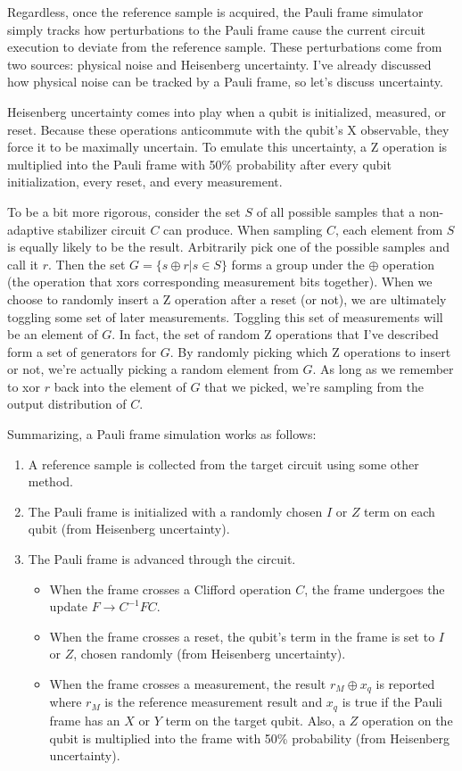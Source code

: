\documentclass[onecolumn,unpublished]{quantumarticle}
\theoremstyle{definition}
\theoremstyle{definition}
\theoremstyle{definition}
\begin{document}
Regardless, once the reference sample is acquired, the Pauli frame simulator simply tracks how perturbations to the Pauli frame cause the current circuit execution to deviate from the reference sample.
These perturbations come from two sources:
physical noise and Heisenberg uncertainty.
I've already discussed how physical noise can be tracked by a Pauli frame, so let's discuss uncertainty.

Heisenberg uncertainty comes into play when a qubit is initialized, measured, or reset.
Because these operations anticommute with the qubit's X observable, they force it to be maximally uncertain.
To emulate this uncertainty, a Z operation is multiplied into the Pauli frame with 50\% probability after every qubit initialization, every reset, and every measurement.

To be a bit more rigorous, consider the set $S$ of all possible samples that a non-adaptive stabilizer circuit $C$ can produce.
When sampling $C$, each element from $S$ is equally likely to be the result.
Arbitrarily pick one of the possible samples and call it $r$.
Then the set $G = \{s \oplus r | s \in S\}$ forms a group under the $\oplus$ operation (the operation that xors corresponding measurement bits together).
When we choose to randomly insert a Z operation after a reset (or not), we are ultimately toggling some set of later measurements.
Toggling this set of measurements will be an element of $G$.
In fact, the set of random Z operations that I've described form a set of generators for $G$.
By randomly picking which Z operations to insert or not, we're actually picking a random element from $G$.
As long as we remember to xor $r$ back into the element of $G$ that we picked, we're sampling from the output distribution of $C$.

Summarizing, a Pauli frame simulation works as follows:

\begin{enumerate}
  \item A reference sample is collected from the target circuit using some other method.
  \item The Pauli frame is initialized with a randomly chosen $I$ or $Z$ term on each qubit (from Heisenberg uncertainty).
  \item The Pauli frame is advanced through the circuit.
  \begin{itemize}
      \item When the frame crosses a Clifford operation $C$, the frame undergoes the update $F \rightarrow C^{-1} F C$.
      \item When the frame crosses a reset, the qubit's term in the frame is set to $I$ or $Z$, chosen randomly (from Heisenberg uncertainty).
      \item When the frame crosses a measurement, the result $r_M \oplus x_q$ is reported where $r_M$ is the reference measurement result and $x_q$ is true if the Pauli frame has an $X$ or $Y$ term on the target qubit.
      Also, a $Z$ operation on the qubit is multiplied into the frame with 50\% probability (from Heisenberg uncertainty).
  \end{itemize}
\end{enumerate}
\end{document}
